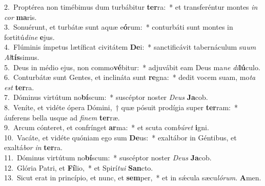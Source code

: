 {2.~}Proptérea non timébimus dum turbábitur \textbf{ter}ra:~* et transferéntur montes \textit{in} \textit{cor} \textbf{ma}ris.\\
{3.~}Sonuérunt, et turbátæ sunt aquæ e\textbf{ó}rum:~* conturbáti sunt montes in fortitú\textit{di}\textit{ne} \textbf{e}jus.\\
{4.~}Flúminis ímpetus lætíficat civitátem \textbf{De}i:~* sanctificávit tabernáculum su\textit{um} \textit{Al}\textbf{tís}simus.\\
{5.~}Deus in médio ejus, non commo\textbf{vé}bitur:~* adjuvábit eam Deus ma\textit{ne} \textit{di}\textbf{lú}culo.\\
{6.~}Conturbátæ sunt Gentes, et inclináta sunt \textbf{re}gna:~* dedit vocem suam, mo\textit{ta} \textit{est} \textbf{ter}ra.\\
{7.~}Dóminus virtútum no\textbf{bí}scum:~* suscéptor noster \textit{De}\textit{us} \textbf{Ja}cob.\\
{8.~}Veníte, et vidéte ópera Dómini,~† quæ pósuit prodígia super \textbf{ter}ram:~* áuferens bella usque ad \textit{fi}\textit{nem} \textbf{ter}ræ.\\
{9.~}Arcum cónteret, et confrínget \textbf{ar}ma:~* et scuta com\textit{bú}\textit{ret} \textbf{i}gni.\\
{10.~}Vacáte, et vidéte quóniam ego sum \textbf{De}us:~* exaltábor in Géntibus, et exaltá\textit{bor} \textit{in} \textbf{ter}ra.\\
{11.~}Dóminus virtútum no\textbf{bí}scum:~* suscéptor noster \textit{De}\textit{us} \textbf{Ja}cob.\\
{12.~}Glória Patri, et \textbf{Fí}lio,~* et Spirí\textit{tu}\textit{i} \textbf{San}cto.\\
{13.~}Sicut erat in princípio, et nunc, et \textbf{sem}per,~* et in sǽcula sæcu\textit{ló}\textit{rum}. \textbf{A}men.\\
